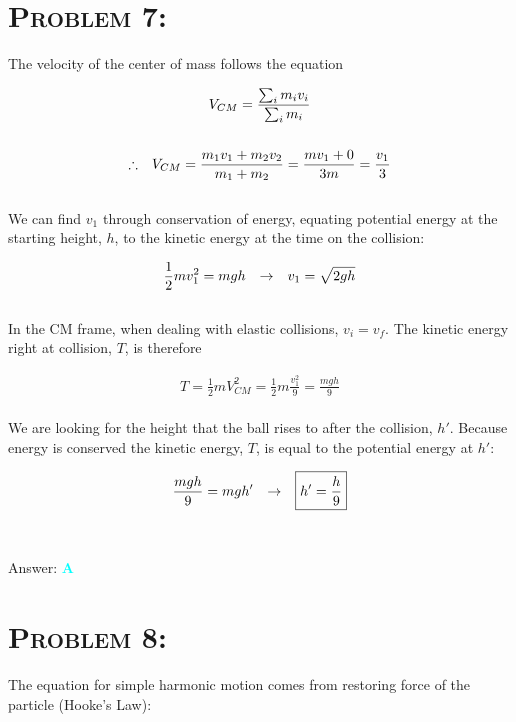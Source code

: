 \documentclass{article}
\begin{document}

\section{\textsc{Problem 7:}} The velocity of the center of mass follows the equation

\begin{gather}
V_{CM} =\frac{ \sum_{i}{m_{i}v_{i}} } { \sum_{i}{m_{i}} }\\
\nonumber\\
\therefore \hspace{.1in} V_{CM} = \frac{ m_{1}v_{1} + m_{2}v_{2}} { m_{1} + m_{2}} = \frac{ mv_{1} + 0} { 3m}= \frac{v_{1}}{3}\nonumber
\end{gather}
\\
We can find $v_{1}$ through conservation of energy, equating potential energy at the starting height, $h$, to the kinetic energy at the time on the collision:

\begin{gather}
\frac{1}{2}mv_{1}^{2} = mgh \hspace{.1in} \rightarrow \hspace{.1in} v_{1} = \sqrt{2gh}\nonumber
\end{gather}
\\
In the CM frame, when dealing with elastic collisions, $v_{i} = v_{f}$. The kinetic energy right at collision, $T$, is therefore 

\begin{gather}
T = \frac{1}{2}mV_{CM}^{2} = \frac{1}{2}m \frac{v_{1}^{2}}{9} = \frac{mgh}{9}\nonumber
\end{gather}
\\
We are looking for the height that the ball rises to after the collision, $h'$. Because energy is conserved the kinetic energy, $T$, is equal to the potential energy at $h'$:

\begin{gather}
\frac{mgh}{9} = mgh' \hspace{.1in} \rightarrow \hspace{.1in} \boxed{h' = \frac{h}{9}} \nonumber
\end{gather}
\\\\
Answer: \textbf{\textcolor{cyan}A}\\


\section{\textsc{Problem 8:}} The equation for simple harmonic motion comes from restoring force of the particle (Hooke's Law):
\end{document}
